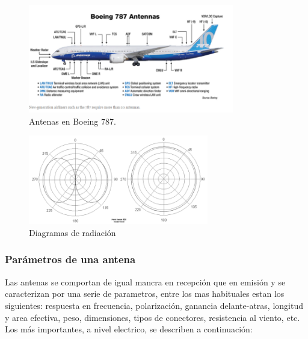   \begin{figure}[!h]
    \centering
  \includegraphics[width=0.8\textwidth]{06.radionavegacion/Imagenes/06.00.ondas.electromagneticas/787-antenas.png}  
    \caption{Antenas en Boeing 787. \protect\cite{Boeing787_antenas}}
      \label{fig:06.antenas.boeing.787}
  \end{figure}



\begin{figure}[!h]
  \centering
  \includegraphics[width=0.7\textwidth]{06.radionavegacion/Imagenes/06.01.adf/diagramas-radiacion.png}
  \caption{Diagramas de radiaci\'on \protect\cite{wikipedia_esp}}
  \label{fig:diagramas-radiacion}
\end{figure}

\subsubsection{Parámetros de una antena}
\label{sec:Parametros.antena}


Las antenas se comportan de igual mancra en recepción que en emisión y se caracterizan por una serie de parametros,
entre los mas habituales estan los siguientes:
respuesta en frecuencia,
polarización,
ganancia delante-atras,
longitud y area efectiva,
peso,
dimensiones,
tipos de conectores,
resistencia al viento, etc. \cite{moyacomunicaciones}
Los más importantes, a nivel electrico, se describen a continuación:

